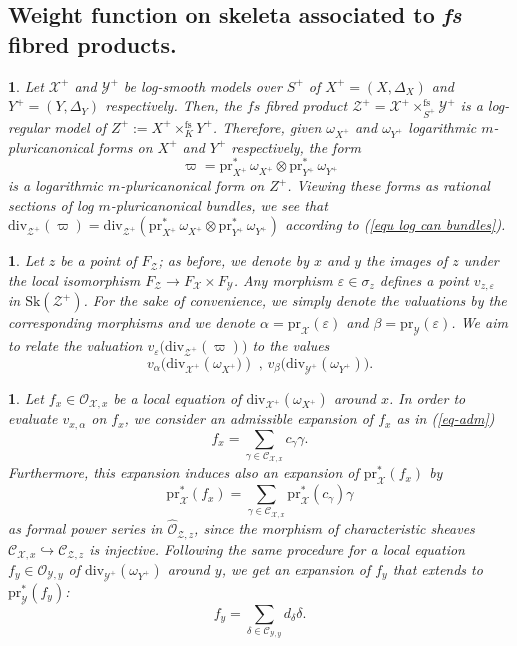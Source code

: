 \documentclass{amsart}%
\numberwithin{equation}{subsection}
\theoremstyle{plain2}
\theoremstyle{definition2}
\theoremstyle{stepstyle}
\theoremstyle{point}
\theoremstyle{subpoint}
\newtheorem{subpoint}[equation]{}%
\newcommand{\spa}[1]{\begin{subpoint}#1\end{subpoint}}           %
\newcommand{\cX}{\ensuremath{\mathscr{X}}}
\newcommand{\caC}{\ensuremath{\mathcal{C}}}
\newcommand{\caO}{\ensuremath{\mathcal{O}}}
\newcommand{\cY}{\ensuremath{\mathscr{Y}}}
\newcommand{\cZ}{\ensuremath{\mathscr{Z}}}
\renewcommand{\cZ}{\ensuremath{\mathscr{Z}}}
\renewcommand{\cY}{\ensuremath{\mathscr{Y}}}
\newcommand{\pr}{\mathrm{pr}}
\newcommand{\divisor}{\mathrm{div}}
\newcommand{\Sk}{\mathrm{Sk}}
\begin{document}
\subsection{Weight function on skeleta associated to \textit{fs} fibred products.} \label{paragraph weight function product}
\spa{Let $\cX^+$ and $\cY^+$ be log-smooth models over $S^+$ of $X^+=(X,\Delta_X)$ and $Y^+=(Y,\Delta_Y)$ respectively. Then, the $fs$ fibred product $\cZ^+=\cX^+  \times^{\text{fs}}_{S^+} \cY^+$ is a log-regular model of $Z^+:=X^+ \times^{\text{fs}}_K Y^+$. Therefore, given $\omega_{X^+}$ and $\omega_{Y^+}$ logarithmic $m$-pluricanonical forms on $X^+$ and $Y^+$ respectively, the form $$\varpi=\pr_{X^+}^* \,\omega_{X^+} \otimes \pr_{Y^+}^* \,\omega_{Y^+}$$ is a logarithmic $m$-pluricanonical form on $Z^+$. Viewing these forms as rational sections of log $m$-pluricanonical bundles, we see that $\divisor_{\cZ^+}(\varpi)=\divisor_{\cZ^+}( \pr_{X^+}^* \,\omega_{X^+} \otimes \pr_{Y^+}^* \,\omega_{Y^+})$ according to (\ref{equ log can bundles}).}

\spa{Let $z$ be a point of $F_{\cZ}$; as before, we denote by $x$ and $y$ the images of $z$ under the local isomorphism $F_{\cZ} \rightarrow F_{\cX} \times F_{\cY}$. Any morphism $\varepsilon \in \sigma_z$ defines a point $v_{z,\varepsilon}$ in $\Sk(\cZ^+)$. For the sake of convenience, we simply denote the valuations by the corresponding morphisms and we denote $\alpha= \pr_{\cX}(\varepsilon)$ and $\beta=\pr_{\cY}(\varepsilon)$. We aim to relate the valuation $v_{\varepsilon}\big(\divisor_{\cZ^+}(\varpi)\big)$ to the values $$v_{\alpha}\big(\divisor_{\cX^+}(\omega_{X^+}\big)) \text{ , } v_{\beta}\big(\divisor_{\cY^+}(\omega_{Y^+})\big).$$}

\spa{Let $f_x \in \caO_{\cX,x}$ be a local equation of $\divisor_{\cX^+}(\omega_{X^+})$ around $x$. In order to evaluate $v_{x,\alpha}$ on $f_x$, we consider an admissible expansion of $f_x$ as in (\ref{eq-adm}) $$f_x=\sum_{\gamma\in \caC_{\cX,x}}c_\gamma \gamma.$$ Furthermore, this expansion induces also an expansion of $\pr_{\cX}^*(f_x)$ by  $$\pr_{\cX}^*(f_x)=\sum_{\gamma\in \caC_{\cX,x} }\pr^*_{\cX}(c_\gamma) \gamma$$ as formal power series in $\widehat{\caO}_{\cZ,z}$, since the morphism of characteristic sheaves $\mathcal{C}_{\cX,x} \hookrightarrow \mathcal{C}_{\cZ,z}$ is injective. Following the same procedure for a local equation $f_y \in \caO_{\cY,y}$ of $\divisor_{\cY^+}(\omega_{Y^+})$ around $y$, we get an expansion of $f_y$ that extends to $\pr_{\cY}^*(f_y)$: 
$$f_y=\sum_{\delta\in \caC_{\cY,y}}d_\delta \delta.$$}
\end{document}
